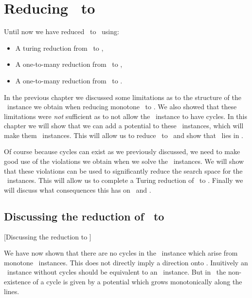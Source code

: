 \setchapterpreamble[u]{\margintoc}
\chapter{Reducing \Tarski\ to \EOPL}\label{ch:eopl_reduction}

Until now we have reduced \Tarski\ to \EndOfLine\ using:
\begin{itemize}
	\item A turing reduction from \Tarski\ to \Tarskistar,
	\item A one-to-many reduction from \Tarskistar\ to \Sperner,
	\item A one-to-many reduction from \Sperner\ to \EndOfLine.
\end{itemize}
In the previous chapter we discussed some limitations as to the structure of the \Sperner\ instance we obtain when reducing monotone \Tarskistar\ to \Sperner. We also showed that these limitations were \emph{not} sufficient as to not allow the \EndOfLine\ instance to have cycles. In this chapter we will show that we can add a potential to these \EndOfLine\ instances, which will make them \EndOfPotentialLine\ instances. This will allow us to reduce \Tarski\ to \EndOfPotentialLine\ and show that \Tarski\ lies in \EOPL\@.

Of course because cycles can exist as we previously discussed, we need to make good use of the violations we obtain when we solve the \EndOfPotentialLine\ instances. We will show that these violations can be used to significantly reduce the search space for the \Tarskistar\ instances. This will allow us to complete a Turing reduction of \Tarskistar\ to \EndOfPotentialLine\@. Finally we will discuss what consequences this has on \UniqueTarski\ and \SuperUniqueTarski\@.

\section{Discussing the reduction of \Tarskistar\ to \EndOfPotentialLine}[Discussing the reduction to \EOPL]

We have now shown that there are no cycles in the \EndOfLine\ instance which arise from monotone \Tarskistar\ instances. This does not directly imply a direction onto \EndOfPotentialLine. Inuitively an \EndOfLine\ instance without cycles should be equivalent to an \EndOfPotentialLine\ instance. But in \EndOfPotentialLine\ the non-existence of a cycle is given by a potential which grows monotonically along the lines.

